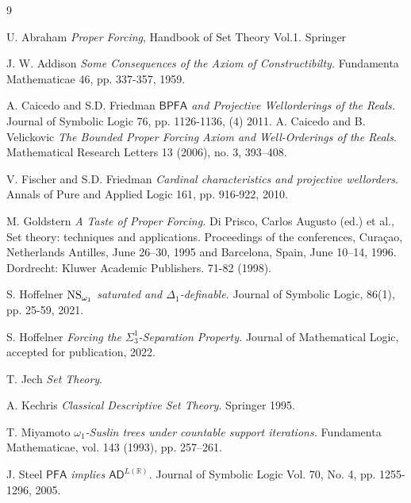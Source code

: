 \documentclass[a4paper,12pt]{article}
\newcommand{\PFA}{\mathsf{PFA}}
\newcommand{\BPFA}{\mathsf{BPFA}}
\newcommand{\NS}{\hbox{NS}_{\omega_1}}
\begin{document}
\begin{thebibliography}{9}

U. Abraham \textit{ Proper Forcing}, Handbook of Set Theory Vol.1. Springer

J. W. Addison \textit{Some Consequences of the Axiom of Constructibilty.} Fundamenta Mathematicae 46, pp. 337-357, 1959.

A. Caicedo and S.D. Friedman \textit{$\BPFA$ and Projective Wellorderings of the Reals.} Journal of Symbolic Logic 76, pp. 1126-1136, (4) 2011.
A. Caicedo and B. Velickovic \textit{The Bounded Proper Forcing Axiom and Well-Orderings of the Reals}.
 Mathematical Research Letters 13 (2006), no. 3, 393–408.

V. Fischer and S.D. Friedman 
\textit{Cardinal characteristics and projective wellorders}. 
Annals of Pure and Applied Logic 161, pp. 916-922, 2010.


 M. Goldstern \textit{A Taste of Proper Forcing.} Di Prisco, Carlos Augusto (ed.) et al., Set theory: techniques and applications. Proceedings of the conferences, Curaçao, Netherlands Antilles, June 26–30, 1995 and Barcelona, Spain, June 10–14, 1996. Dordrecht: Kluwer Academic Publishers. 71-82 (1998).

 S. Hoffelner \textit{$\NS$ saturated and $\Delta_1$-definable.}  Journal of Symbolic Logic, 86(1), pp. 25-59, 2021.

 S. Hoffelner \textit{Forcing the $\Sigma^1_3$-Separation Property.} Journal of Mathematical Logic, accepted for publication, 2022.

 T. Jech \textit{Set Theory}.
 
A. Kechris 
\textit{Classical Descriptive Set Theory}.  
Springer 1995.

 T. Miyamoto {\em $\omega_1$-Suslin trees under countable support iterations.} Fundamenta Mathematicae,
vol. 143 (1993), pp. 257–261.


  J. Steel \textit{$\PFA$ implies $\mathsf{AD}^{L(\mathbb{R} ) } $. } Journal of Symbolic Logic
Vol. 70, No. 4, pp. 1255-1296, 2005.


\end{thebibliography}
\end{document}

